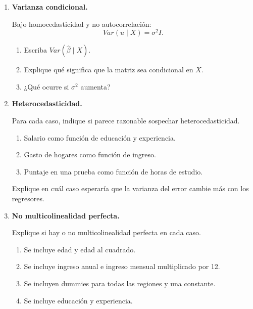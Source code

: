 \documentclass[11pt]{article}
\begin{document}
\begin{enumerate}[label=\textbf{Ejercicio \arabic*.}, leftmargin=*]
Use:
\[
\hat{\beta}=(X^\top X)^{-1}X^\top y,
\qquad
y=X\beta+u.
\]

\begin{enumerate}[label=\alph*)]
    \item Muestre que \(\hat{\beta}=\beta+(X^\top X)^{-1}X^\top u\).
    \item Tome esperanza condicional en \(X\).
    \item Explique qué condición permite concluir que \(E(\hat{\beta}\mid X)=\beta\).
\end{enumerate}

\item \textbf{Varianza condicional.}

Bajo homocedasticidad y no autocorrelación:
\[
Var(u\mid X)=\sigma^2 I.
\]

\begin{enumerate}[label=\alph*)]
    \item Escriba \(Var(\hat{\beta}\mid X)\).
    \item Explique qué significa que la matriz sea condicional en \(X\).
    \item ¿Qué ocurre si \(\sigma^2\) aumenta?
\end{enumerate}

\item \textbf{Heterocedasticidad.}

Para cada caso, indique si parece razonable sospechar heterocedasticidad.

\begin{enumerate}[label=\alph*)]
    \item Salario como función de educación y experiencia.
    \item Gasto de hogares como función de ingreso.
    \item Puntaje en una prueba como función de horas de estudio.
\end{enumerate}

Explique en cuál caso esperaría que la varianza del error cambie más con los regresores.

\item \textbf{No multicolinealidad perfecta.}

Explique si hay o no multicolinealidad perfecta en cada caso.

\begin{enumerate}[label=\alph*)]
    \item Se incluye edad y edad al cuadrado.
    \item Se incluye ingreso anual e ingreso mensual multiplicado por 12.
    \item Se incluyen dummies para todas las regiones y una constante.
    \item Se incluye educación y experiencia.
\end{enumerate}


\end{enumerate}
\end{document}
